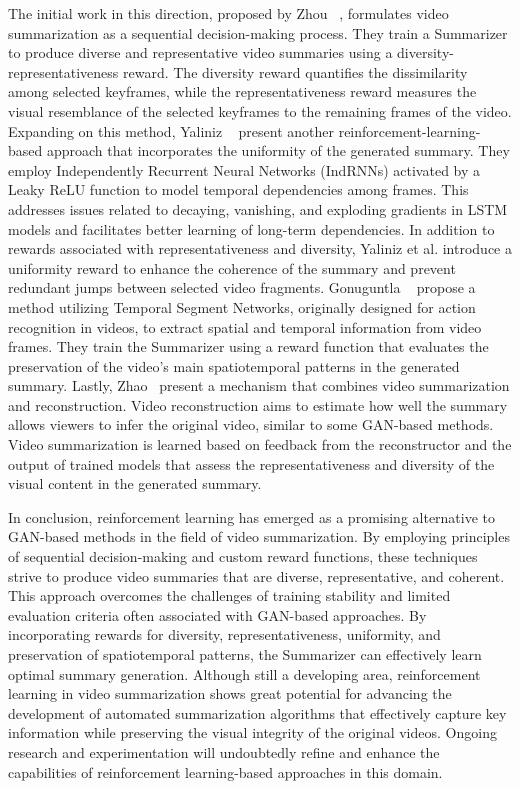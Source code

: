 The initial work in this direction, proposed by Zhou \etal~\cite{zhou2018deep}, formulates video summarization as a sequential decision-making process. They train a Summarizer to produce diverse and representative video summaries using a diversity-representativeness reward. The diversity reward quantifies the dissimilarity among selected keyframes, while the representativeness reward measures the visual resemblance of the selected keyframes to the remaining frames of the video. Expanding on this method, Yaliniz \etal~\cite{yaliniz2021using} present another reinforcement-learning-based approach that incorporates the uniformity of the generated summary. They employ Independently Recurrent Neural Networks (IndRNNs) activated by a Leaky ReLU function to model temporal dependencies among frames. This addresses issues related to decaying, vanishing, and exploding gradients in LSTM models and facilitates better learning of long-term dependencies. In addition to rewards associated with representativeness and diversity, Yaliniz et al. introduce a uniformity reward to enhance the coherence of the summary and prevent redundant jumps between selected video fragments. Gonuguntla \etal~\cite{gonuguntla2019enhanced} propose a method utilizing Temporal Segment Networks, originally designed for action recognition in videos, to extract spatial and temporal information from video frames. They train the Summarizer using a reward function that evaluates the preservation of the video's main spatiotemporal patterns in the generated summary. Lastly, Zhao \etal~\cite{zhao2019property}present a mechanism that combines video summarization and reconstruction. Video reconstruction aims to estimate how well the summary allows viewers to infer the original video, similar to some GAN-based methods. Video summarization is learned based on feedback from the reconstructor and the output of trained models that assess the representativeness and diversity of the visual content in the generated summary.

In conclusion, reinforcement learning has emerged as a promising alternative to GAN-based methods in the field of video summarization. By employing principles of sequential decision-making and custom reward functions, these techniques strive to produce video summaries that are diverse, representative, and coherent. This approach overcomes the challenges of training stability and limited evaluation criteria often associated with GAN-based approaches. By incorporating rewards for diversity, representativeness, uniformity, and preservation of spatiotemporal patterns, the Summarizer can effectively learn optimal summary generation. Although still a developing area, reinforcement learning in video summarization shows great potential for advancing the development of automated summarization algorithms that effectively capture key information while preserving the visual integrity of the original videos. Ongoing research and experimentation will undoubtedly refine and enhance the capabilities of reinforcement learning-based approaches in this domain.